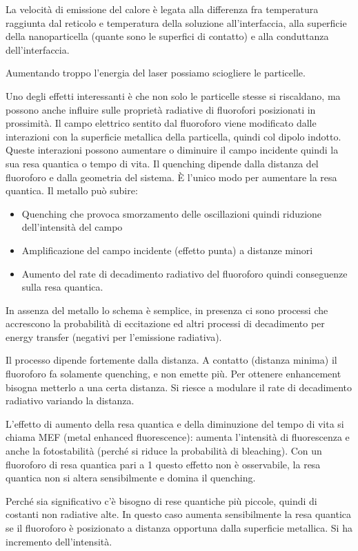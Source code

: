 La velocità di emissione del calore è legata alla differenza fra
temperatura raggiunta dal reticolo e temperatura della soluzione
all'interfaccia, alla superficie della nanoparticella (quante sono le
superfici di contatto) e alla conduttanza dell'interfaccia.

Aumentando troppo l'energia del laser possiamo sciogliere le particelle.

Uno degli effetti interessanti è che non solo le particelle stesse si
riscaldano, ma possono anche influire sulle proprietà radiative di
fluorofori posizionati in prossimità. Il campo elettrico sentito dal
fluoroforo viene modificato dalle interazioni con la superficie
metallica della particella, quindi col dipolo indotto. Queste
interazioni possono aumentare o diminuire il campo incidente quindi la
sua resa quantica o tempo di vita. Il quenching dipende dalla distanza
del fluoroforo e dalla geometria del sistema. È l'unico modo per
aumentare la resa quantica. Il metallo può subire:

\begin{itemize}
\item
  Quenching che provoca smorzamento delle oscillazioni quindi riduzione
  dell'intensità del campo
\item
  Amplificazione del campo incidente (effetto punta) a distanze minori
\item
  Aumento del rate di decadimento radiativo del fluoroforo quindi
  conseguenze sulla resa quantica.
\end{itemize}

In assenza del metallo lo schema è semplice, in presenza ci sono
processi che accrescono la probabilità di eccitazione ed altri processi
di decadimento per energy transfer (negativi per l'emissione radiativa).

Il processo dipende fortemente dalla distanza. A contatto (distanza
minima) il fluoroforo fa solamente quenching, e non emette più. Per
ottenere enhancement bisogna metterlo a una certa distanza. Si riesce a
modulare il rate di decadimento radiativo variando la distanza.

L'effetto di aumento della resa quantica e della diminuzione del tempo
di vita si chiama MEF (metal enhanced fluorescence): aumenta l'intensità
di fluorescenza e anche la fotostabilità (perché si riduce la
probabilità di bleaching). Con un fluoroforo di resa quantica pari a 1
questo effetto non è osservabile, la resa quantica non si altera
sensibilmente e domina il quenching.

Perché sia significativo c'è bisogno di rese quantiche più piccole,
quindi di costanti non radiative alte. In questo caso aumenta
sensibilmente la resa quantica se il fluoroforo è posizionato a distanza
opportuna dalla superficie metallica. Si ha incremento dell'intensità.

